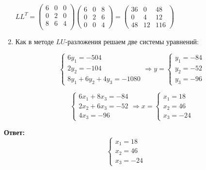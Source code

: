 \documentclass[a4paper,12pt]{article} %
\begin{document}
\begin{enumerate}
\vspace{0.2cm}
$
LL^T = \left(\begin{matrix}
6 & 0 & 0\\
0 & 2 & 0\\
8 & 6 & 4\\
\end{matrix}\right)
\left(\begin{matrix}
6 & 0 & 8\\
0 & 2 & 6\\
0 & 0 & 4
\end{matrix}\right) =
\left(\begin{matrix}
36 & 0 & 48\\
0 & 4 & 12 \\
48 & 12 & 116
\end{matrix}\right)
$

\item Как в методе $LU$-разложения решаем две системы уравнений:

\begin{equation*}
    \begin{cases}
    6y_1 = -504\\
    2y_2 = -104\\
    8y_1 + 6y_2 + 4y_3 = -1080
    \end{cases}
    \Rightarrow
    y =
    \begin{cases}
    y_1 = -84\\
    y_2 = -52\\
    y_3 = -96
    \end{cases}
\end{equation*}

\begin{equation*}
    \begin{cases}
    6x_1 + 8x_3 = -84\\
    2x_2 + 6x_3 = -52\\
    4x_3 = -96
    \end{cases}
    \Rightarrow
    x =
    \begin{cases}
    x_1 = 18\\
    x_2 = 46\\
    x_3 = -24
    \end{cases}
\end{equation*}

\end{enumerate}
\begin{center}
\Large \textbf{Ответ:}
\begin{equation*}
    \begin{cases}
    x_1 = 18\\
    x_2 = 46\\
    x_3 = -24
    \end{cases}
\end{equation*}
\end{center}
\end{document}
